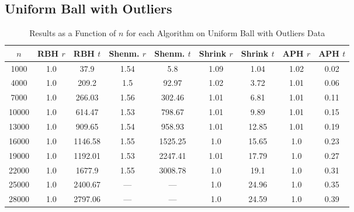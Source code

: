 \documentclass[11pt,twoside]{report}
\theoremstyle{definition}
\numberwithin{theorem}{section}
\numberwithin{definition}{section}
\numberwithin{lemma}{section}
\numberwithin{proposition}{section}
\numberwithin{equation}{section}
\numberwithin{figure}{section}
\begin{document}
\begin{appendices}
    
    \subsection{Uniform Ball with Outliers}
    \begin{table}[ht]
        \centering
        \begin{tabular}{|c||c|c||c|c||c|c||c|c|}\hline
            $n$&RBH $r$&RBH $t$&Shenm. $r$&Shenm. $t$&Shrink $r$&Shrink $t$&APH $r$&APH $t$ \\ \hline
            1000&1.0&37.9&1.54&5.8&1.09&1.04&1.02&0.02 \\
            4000&1.0&209.2&1.5&92.97&1.02&3.72&1.01&0.06 \\
            7000&1.0&266.03&1.56&302.46&1.01&6.81&1.01&0.11 \\
            10000&1.0&614.47&1.53&798.67&1.01&9.89&1.01&0.15 \\
            13000&1.0&909.65&1.54&958.93&1.01&12.85&1.01&0.19 \\
            16000&1.0&1146.58&1.55&1525.25&1.0&15.65&1.0&0.23 \\
            19000&1.0&1192.01&1.53&2247.41&1.01&17.79&1.0&0.27 \\
            22000&1.0&1677.9&1.55&3008.78&1.0&19.1&1.0&0.31 \\
            25000&1.0&2400.67&---&---&1.0&24.96&1.0&0.35 \\
            28000&1.0&2797.06&---&---&1.0&24.59&1.0&0.39 \\ \hline
        \end{tabular}
        \caption{Results as a Function of $n$ for each Algorithm on Uniform Ball with Outliers Data}
        \label{tab:uniform_ball_with_outliers_table_n}
    \end{table}
    

\end{appendices}
\end{document}
